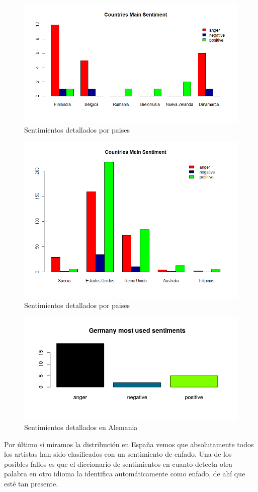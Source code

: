 \begin{figure}[h]
	\centering
	\includegraphics[width=0.7\linewidth]{Imagenes/country2}
	\caption{Sentimientos detallados por paises}
	\label{fig:country2}
\end{figure}

\begin{figure}[h]
	\centering
	\includegraphics[width=0.7\linewidth]{Imagenes/country1}
	\caption{Sentimientos detallados por paises}
	\label{fig:country1}
\end{figure}

\begin{figure}[h]
	\centering
	\includegraphics[width=0.7\linewidth]{Imagenes/Germany}
	\caption{Sentimientos detallados en Alemania}
	\label{fig:Germany}
\end{figure}

Por último si miramos la distribución en España vemos que absolutamente todos los artistas han sido clasificados con un sentimiento de enfado. Una de los posibles fallos es que el diccionario de sentimientos en cuanto detecta otra palabra en otro idioma la identifica automáticamente como enfado, de ahí que esté tan presente.

